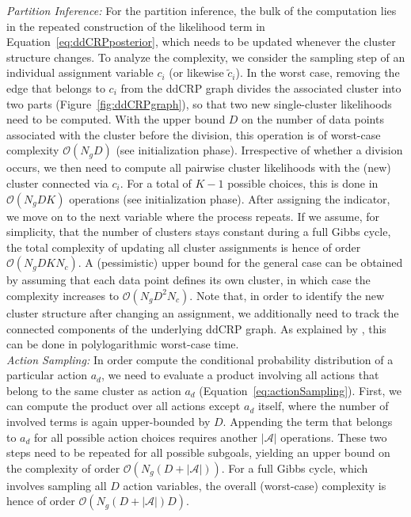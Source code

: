 \documentclass[twoside,11pt]{article}
\begin{document}
\noindent \textit{Partition Inference:}
For the partition inference, the bulk of the computation lies in the repeated construction of the likelihood term in Equation~\eqref{eq:ddCRPposterior}, which needs to be updated whenever the cluster structure changes.
%
%
%
%
%
%
%
To analyze the complexity, we consider the sampling step of an individual assignment variable $c_i$ (or likewise $\tilde{c}_i$). In the worst case, removing the edge that belongs to $c_i$ from the ddCRP graph divides the associated cluster into two parts (Figure~\ref{fig:ddCRPgraph}), so that two new single-cluster likelihoods need to be computed. With the %
upper bound $D$ on the number of data points associated with the cluster before the division, this operation is of worst-case complexity $\mathcal{O}(N_gD)$ (see initialization phase). Irrespective of whether a division occurs, we then need to compute all pairwise cluster likelihoods %
with the (new) cluster connected via $c_i$. For a total of $K-1$ possible %
choices, this is done in $\mathcal{O}(N_gDK)$ operations (see initialization phase). After assigning the indicator, we move on to the next variable where the process repeats. If we assume, for simplicity, that the number of clusters stays constant during a full Gibbs cycle, the total complexity of updating all cluster assignments is hence of order $\mathcal{O}(N_gDKN_c)$. A (pessimistic) upper bound for the %
general case can be obtained by assuming that each data point defines its own cluster, in which case the complexity increases to $\mathcal{O}(N_gD^2N_c)$. Note that, in order to identify the new %
cluster structure after changing an assignment, we additionally need to track the connected components of the underlying ddCRP graph. As explained by \citet{kapron2013dynamic}, this can be done in polylogarithmic worst-case time. \\

%

%



\noindent\textit{Action Sampling:}
In order compute the conditional probability distribution of a particular action $a_d$, we need to evaluate a product involving all actions that belong to the same cluster as action $a_d$ (Equation~\ref{eq:actionSampling}). First, we can compute the product over all actions except $a_d$ itself, where the number of involved terms is again upper-bounded by $D$. %
Appending the term that belongs to $a_d$ for all possible action choices requires another $|\mathcal{A}|$ operations. These two steps need to be repeated for all possible subgoals, yielding an upper bound on the complexity of order $\mathcal{O}(N_g(D+|\mathcal{A}|))$. For a full Gibbs cycle, which involves sampling all $D$ action variables, the overall (worst-case) complexity is hence of order $\mathcal{O}(N_g(D+|\mathcal{A}|)D)$.
\end{document}
